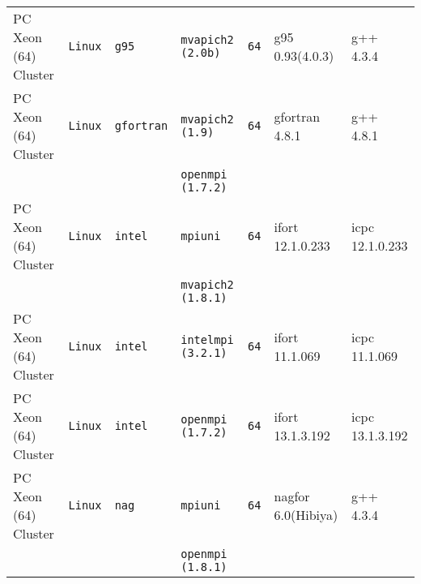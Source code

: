 \begin{longtable}{lllllll}
PC Xeon (64) Cluster  &\tt Linux  &\tt g95          &\tt mvapich2 (2.0b)  &\tt 64           & g95 \footnotesize 0.93(4.0.3)       & g++ \footnotesize 4.3.4         \\ %
PC Xeon (64) Cluster  &\tt Linux  &\tt gfortran     &\tt mvapich2 (1.9)   &\tt 64           & gfortran \footnotesize 4.8.1        & g++ \footnotesize 4.8.1         \\ %
                      &           &                 &\tt openmpi (1.7.2)  &                 &                                     &                                 \\
PC Xeon (64) Cluster  &\tt Linux  &\tt intel        &\tt mpiuni           &\tt 64           & ifort \footnotesize 12.1.0.233      & icpc \footnotesize 12.1.0.233   \\ %
                      &           &                 &\tt mvapich2 (1.8.1) &                 &                                     &                                 \\
PC Xeon (64) Cluster  &\tt Linux  &\tt intel        &\tt intelmpi (3.2.1) &\tt 64           & ifort \footnotesize 11.1.069        & icpc \footnotesize 11.1.069     \\ %
PC Xeon (64) Cluster  &\tt Linux  &\tt intel        &\tt openmpi (1.7.2)  &\tt 64           & ifort \footnotesize 13.1.3.192      & icpc \footnotesize 13.1.3.192   \\ %
PC Xeon (64) Cluster  &\tt Linux  &\tt nag          &\tt mpiuni           &\tt 64           & nagfor \footnotesize 6.0(Hibiya)    & g++  \footnotesize 4.3.4        \\ %
                      &           &                 &\tt openmpi (1.8.1)  &                 &                                     &                                 \\

\end{longtable}
